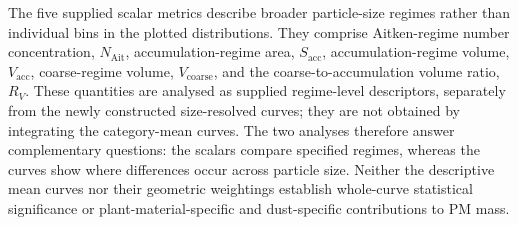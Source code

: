 The five supplied scalar metrics describe broader particle-size
regimes rather than individual bins in the plotted distributions.
They comprise Aitken-regime number concentration,
\(N_{\mathrm{Ait}}\), accumulation-regime area,
\(S_{\mathrm{acc}}\), accumulation-regime volume,
\(V_{\mathrm{acc}}\), coarse-regime volume,
\(V_{\mathrm{coarse}}\), and the coarse-to-accumulation volume
ratio, \(R_V\). These quantities are analysed as supplied
regime-level descriptors, separately from the newly constructed
size-resolved curves; they are not obtained by integrating the
category-mean curves. The two analyses therefore answer
complementary questions: the scalars compare specified regimes,
whereas the curves show where differences occur across particle
size. Neither the descriptive mean curves nor their geometric
weightings establish whole-curve statistical significance or
plant-material-specific and dust-specific contributions to PM mass.
